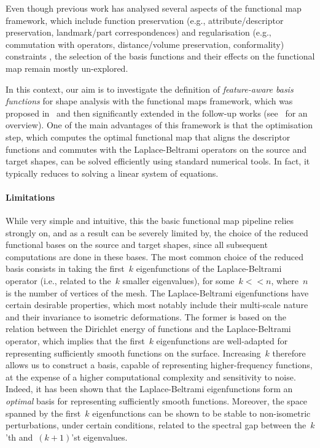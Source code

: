 \documentclass[acmtog,authorversion]{acmart}
\begin{document}
Even though previous work has analysed several aspects of the functional map framework, which
include function preservation (e.g., attribute/descriptor preservation, landmark/part
correspondences) and regularisation (e.g., commutation with operators, distance/volume preservation,
conformality) constraints \citep{OVSJANIKOV2017-STAR}, the selection of the basis functions and their effects on the functional map remain mostly un-explored. 

In this context, our aim is to investigate the definition of \emph{feature-aware basis functions} for shape analysis with the functional maps framework, which was proposed in~\citep{OVSJANIKOV2012} and then significantly extended in the follow-up works (see~\citep{OVSJANIKOV2017-STAR} for an overview). One of the main advantages of this framework is that the optimisation step, which computes the optimal functional map that aligns the descriptor functions and commutes with the Laplace-Beltrami operators on the source and target shapes, can be solved efficiently using standard numerical tools. In fact, it typically reduces to solving a linear system of equations.

\paragraph*{Limitations}
While very simple and intuitive, this the basic functional map pipeline relies strongly on, and as a result can be severely limited by, the choice of the reduced functional bases on the source and target shapes, since all subsequent computations are done in these bases. The most common choice of the reduced basis consists in taking the first~$k$ eigenfunctions of the Laplace-Beltrami operator (i.e., related to the~$k$ smaller eigenvalues), for some~$k<<n$, where~$n$ is the number of vertices of the mesh. The Laplace-Beltrami eigenfunctions have certain desirable properties, which most notably include their multi-scale nature and their invariance to isometric deformations. The former is based on the relation between the Dirichlet energy of functions and the Laplace-Beltrami operator, which implies that the first~$k$ eigenfunctions are well-adapted for representing sufficiently smooth functions on the surface. Increasing~$k$ therefore allows us to construct a basis, capable of representing higher-frequency functions, at the expense of a higher computational complexity and sensitivity to noise. Indeed, it has been shown that the Laplace-Beltrami eigenfunctions form an \emph{optimal} basis for representing sufficiently smooth functions. Moreover, the space spanned by the first~$k$ eigenfunctions can be shown to be stable to non-isometric perturbations, under certain conditions, related to the spectral gap between the~$k$'th and~$(k+1)$'st eigenvalues.
\end{document}
